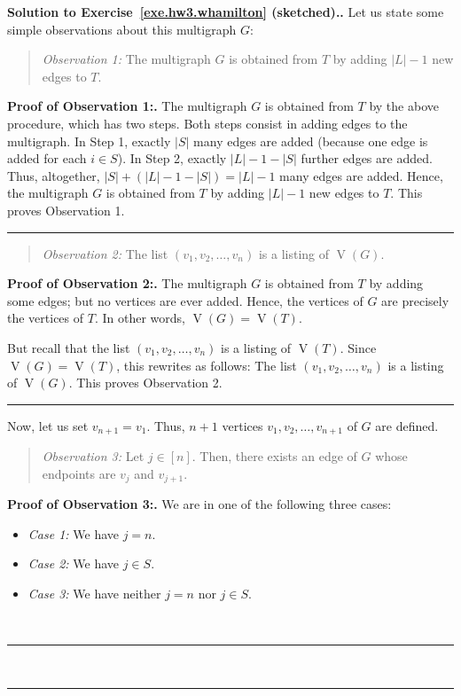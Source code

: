 \documentclass[numbers=enddot,12pt,final,onecolumn,notitlepage]{scrartcl}%
\theoremstyle{definition}
\newenvironment{statement}{\begin{quote}}{\end{quote}}
\newenvironment{proof}[1][Proof]{\noindent\textbf{#1.} }{\ \rule{0.5em}{0.5em}}
\newcommand{\abs}[1]{\left| #1 \right|}
\newcommand{\tup}[1]{\left( #1 \right)}
\newcommand{\ive}[1]{\left[ #1 \right]}
\newcommand{\verts}[1]{\operatorname{V}\left( #1 \right)}
\begin{document}
\begin{proof}[Solution to Exercise~\ref{exe.hw3.whamilton}
(sketched).]
Let us state some simple observations about this multigraph $G$:

\begin{statement}
\textit{Observation 1:}
The multigraph $G$ is obtained from $T$ by adding
$\abs{L}-1$ new edges to $T$.
\end{statement}

\begin{proof}[Proof of Observation 1:]
The multigraph $G$ is obtained from $T$ by the above procedure,
which has two steps.
Both steps consist in adding edges to the multigraph.
In Step 1, exactly $\abs{S}$ many edges are added (because one edge
is added for each $i \in S$).
In Step 2, exactly $\abs{L} - 1 - \abs{S}$ further edges
are added.
Thus, altogether,
$\abs{S} + \tup{\abs{L} - 1 - \abs{S}} = \abs{L} - 1$
many edges are added.
Hence, the multigraph $G$ is obtained from $T$ by adding
$\abs{L}-1$ new edges to $T$.
This proves Observation 1.
\end{proof}

\begin{statement}
\textit{Observation 2:}
The list $\tup{v_1, v_2, \ldots, v_n}$ is a listing of $\verts{G}$.
\end{statement}

\begin{proof}[Proof of Observation 2:]
The multigraph $G$ is obtained from $T$ by adding some edges; but no
vertices are ever added.
Hence, the vertices of $G$ are precisely the vertices of $T$.
In other words, $\verts{G} = \verts{T}$.

But recall that the list $\tup{v_1, v_2, \ldots, v_n}$ is a listing
of $\verts{T}$.
Since $\verts{G} = \verts{T}$, this rewrites as follows:
The list $\tup{v_1, v_2, \ldots, v_n}$ is a listing of $\verts{G}$.
This proves Observation 2.
\end{proof}

Now, let us set $v_{n+1} = v_1$.
Thus, $n+1$ vertices $v_1, v_2, \ldots, v_{n+1}$ of $G$ are defined.

\begin{statement}
\textit{Observation 3:}
Let $j \in \ive{n}$.
Then, there exists an edge of $G$ whose endpoints are $v_j$ and
$v_{j+1}$.
\end{statement}

\begin{proof}[Proof of Observation 3:]
We are in one of the following three cases:
\begin{itemize}
\item \textit{Case 1:} We have $j = n$.
\item \textit{Case 2:} We have $j \in S$.
\item \textit{Case 3:} We have neither $j = n$ nor $j \in S$.
\end{itemize}


\end{proof}
\end{proof}
\end{document}
